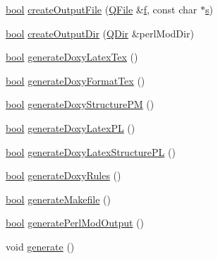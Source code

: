 \begin{DoxyCompactItemize}
\item 
\hyperlink{qglobal_8h_a1062901a7428fdd9c7f180f5e01ea056}{bool} \hyperlink{class_perl_mod_generator_a94285435e055fe6b0ac52282b6af5c38}{create\+Output\+File} (\hyperlink{class_q_file}{Q\+File} \&\hyperlink{060__command__switch_8tcl_af6830d2c644b45088ea8f1f74a46b778}{f}, const char $\ast$\hyperlink{060__command__switch_8tcl_a011c73f2dbb87635a3b4206c72355f6e}{s})
\item 
\hyperlink{qglobal_8h_a1062901a7428fdd9c7f180f5e01ea056}{bool} \hyperlink{class_perl_mod_generator_ab76a8df150d051532cfc8c3794d95f3f}{create\+Output\+Dir} (\hyperlink{class_q_dir}{Q\+Dir} \&perl\+Mod\+Dir)
\item 
\hyperlink{qglobal_8h_a1062901a7428fdd9c7f180f5e01ea056}{bool} \hyperlink{class_perl_mod_generator_a2cb28a6f8bf6b9f155d3929b95acf059}{generate\+Doxy\+Latex\+Tex} ()
\item 
\hyperlink{qglobal_8h_a1062901a7428fdd9c7f180f5e01ea056}{bool} \hyperlink{class_perl_mod_generator_a1f0a8822b1895daacce85dd3d93eecac}{generate\+Doxy\+Format\+Tex} ()
\item 
\hyperlink{qglobal_8h_a1062901a7428fdd9c7f180f5e01ea056}{bool} \hyperlink{class_perl_mod_generator_a9893c2c270028114dec964284676adc7}{generate\+Doxy\+Structure\+P\+M} ()
\item 
\hyperlink{qglobal_8h_a1062901a7428fdd9c7f180f5e01ea056}{bool} \hyperlink{class_perl_mod_generator_a999b190603bbc840657ad470a17465ad}{generate\+Doxy\+Latex\+P\+L} ()
\item 
\hyperlink{qglobal_8h_a1062901a7428fdd9c7f180f5e01ea056}{bool} \hyperlink{class_perl_mod_generator_ad03aadb67e05b528cd454bed3bee16b9}{generate\+Doxy\+Latex\+Structure\+P\+L} ()
\item 
\hyperlink{qglobal_8h_a1062901a7428fdd9c7f180f5e01ea056}{bool} \hyperlink{class_perl_mod_generator_a72b6d57151d45a13c60402914aa50831}{generate\+Doxy\+Rules} ()
\item 
\hyperlink{qglobal_8h_a1062901a7428fdd9c7f180f5e01ea056}{bool} \hyperlink{class_perl_mod_generator_a473b6bd63ac2f9ea9fe6de4f8170194b}{generate\+Makefile} ()
\item 
\hyperlink{qglobal_8h_a1062901a7428fdd9c7f180f5e01ea056}{bool} \hyperlink{class_perl_mod_generator_a4c5977a4e048326d58cabd7d348463ea}{generate\+Perl\+Mod\+Output} ()
\item 
void \hyperlink{class_perl_mod_generator_af6bb93beb1eac9b861832d368ffad291}{generate} ()
\end{DoxyCompactItemize}

